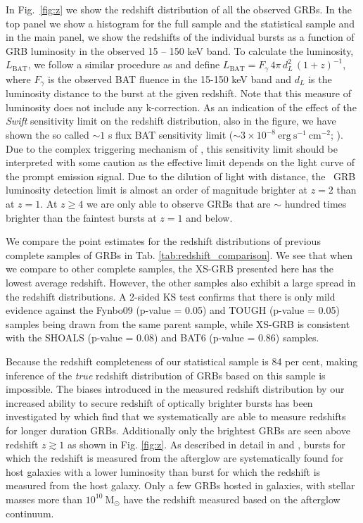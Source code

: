 \documentclass{aa}    %
\begin{document}
In Fig.~\ref{fig:z} we show the redshift distribution of all  the observed GRBs.
In the top panel we show a histogram for the full sample and the statistical
sample and in the main panel, we show the redshifts of the individual bursts as
a function of GRB luminosity in the observed 15 -- 150 keV band. To calculate the
luminosity, $L_{\mathrm{BAT}}$, we follow a similar procedure as
\citet{Lien2016} and define $L_{\mathrm{BAT}} = F_{\gamma}\,4
\pi\,d_L^2\,(1+z)^{-1}$, where $F_{\gamma}$ is the observed BAT fluence in the
15-150 keV band and $d_L$ is the luminosity distance to the burst at the given
redshift. Note that this measure of luminosity does not include any
k-correction. As an indication of the effect of the \textit{Swift} sensitivity
limit on the redshift distribution, also in the figure, we have shown the so
called $\sim 1$ s flux BAT sensitivity limit ($\sim 3 \times
10^{-8}~\mathrm{erg}~\mathrm{s}^{-1}~\mathrm{cm}^{-2}$;
\citealt{Baumgartner2013, Lien2016}). Due to the complex triggering mechanism of
\swift, this sensitivity limit should be interpreted with some caution as the
effective limit depends on the light curve of the prompt emission signal. Due to
the dilution of light with distance, the \swift~GRB luminosity detection limit
is almost an order of magnitude brighter at $z=2$ than at $z=1$. At $z\geq4$
we are only able to observe GRBs that are $\sim$ hundred times brighter than the
faintest bursts at $z=1$ and below.

We compare the point estimates for the redshift distributions of previous
complete samples of GRBs in Tab. \ref{tab:redshift_comparison}. We see that when
we compare to other complete samples, the XS-GRB presented here has the lowest
average redshift. However, the other samples also exhibit a large spread in the
redshift distributions. A 2-sided KS test confirms that there is only mild
evidence against the Fynbo09 (p-value = 0.05) and TOUGH (p-value = 0.05) samples
being drawn from the same parent sample, while XS-GRB is consistent with the
SHOALS (p-value = 0.08) and BAT6 (p-value = 0.86) samples.

Because the redshift completeness of our statistical sample is 84 per cent,
making inference of the \textit{true} redshift distribution of GRBs based on
this sample is impossible. The biases introduced in the measured redshift
distribution by our increased ability to secure redshift of optically brighter
bursts has been investigated by \citet{Turpin2016} which find that we
systematically are able to measure redshifts for longer duration GRBs.
Additionally only the brightest GRBs are seen above redshift $z \gtrsim 1$ as
shown in Fig. \ref{fig:z}. As described in detail in \citet{Hjorth2012} and
\citet{Perley2016b}, bursts for which the redshift is measured from the
afterglow are systematically found for host galaxies with a lower luminosity
than burst for which the redshift is measured from the host galaxy. Only a few
GRBs hosted in galaxies, with stellar masses more than
$10^{10}~\mathrm{M}_\odot$ have the redshift measured based on the afterglow
continuum.
\end{document}
